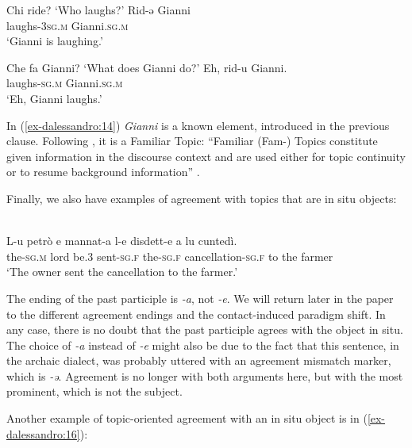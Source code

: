 \documentclass[output=paper
,modfonts
,nonflat]{langsci/langscibook}
\begin{document}
\begin{exe} \settowidth{}
	\ex  \label{ex-dalessandro:13}\citet[9]{Paciaroni2017} \xlist
	\ex   Chi ride{?} 
	\glt `Who laughs{?}' 
	\ex
	\gll  Rid-ə     Gianni\\ 
	laughs-\textsc{3sg.m} Gianni.\textsc{sg.m}\\ 
	\glt `Gianni is laughing.'
	\endxlist
\end{exe}
\begin{exe} \settowidth{}
	\ex \label{ex-dalessandro:14} \citet[9]{Paciaroni2017} \xlist
	\ex   Che fa Gianni? 
	\glt `What does Gianni do?' 
	\ex
	\gll  Eh,   rid-u     Gianni.\\ 
	{ } laughs-\textsc{sg.m} Gianni.\textsc{sg.m}\\ 
	\glt `Eh, Gianni laughs.'
	\endxlist
\end{exe}
In (\ref{ex-dalessandro:14}) \textit{Gianni} is a known element, introduced in the previous clause. Following \citet{Frascarelli2012}, it is a Familiar Topic: “Familiar (Fam-) Topics constitute given information in the discourse context and are used either for topic continuity or to resume background information” \citep[181]{Frascarelli2012}. 

Finally, we also have examples of agreement with topics that are in situ objects:

\begin{exe}
	\ex \label{ex-dalessandro:15}	\citet[93]{Rossi2008}\\
	\gll L-u     petrò e   mannat-a l-e   disdett-e a lu cuntedì.\\
	the-\textsc{sg.m}  lord  be.3  sent-\textsc{sg.f} the-\textsc{sg.f} cancellation-\textsc{sg.f} to the farmer\\
	\glt `The owner sent the cancellation to the farmer.'
\end{exe}
The ending of the past participle is \textit{-a}, not \textit{-e}. We will return later in the paper to the different agreement endings and the contact-induced paradigm shift. In any case, there is no doubt that the past participle agrees with the object in situ. The choice of \textit{-a} instead of \textit{-e} might also be due to the fact that this sentence, in the archaic dialect, was probably uttered with an agreement mismatch marker, which is \textit{-ə}. Agreement is no longer with both arguments here, but with the most prominent, which is not the subject. 

Another example of topic-oriented agreement with an in situ object is in (\ref{ex-dalessandro:16}):
\end{document}

